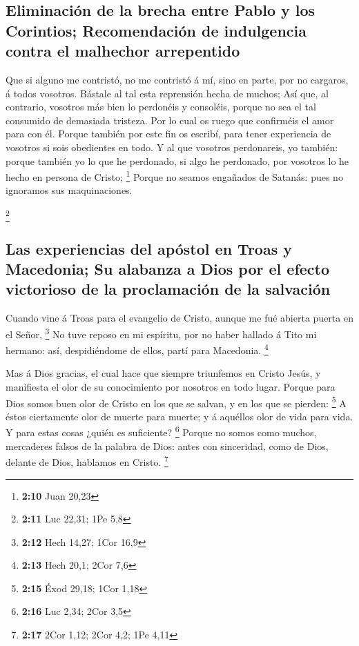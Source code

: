 \hypertarget{eliminaciuxf3n-de-la-brecha-entre-pablo-y-los-corintios-recomendaciuxf3n-de-indulgencia-contra-el-malhechor-arrepentido}{%
\subsection{Eliminación de la brecha entre Pablo y los Corintios;
Recomendación de indulgencia contra el malhechor
arrepentido}\label{eliminaciuxf3n-de-la-brecha-entre-pablo-y-los-corintios-recomendaciuxf3n-de-indulgencia-contra-el-malhechor-arrepentido}}

 Que si alguno me contristó, no me contristó á mí, sino en
parte, por no cargaros, á todos vosotros.  Bástale al tal
esta reprensión hecha de muchos;  Así que, al contrario,
vosotros más bien lo perdonéis y consoléis, porque no sea el tal
consumido de demasiada tristeza.  Por lo cual os ruego que
confirméis el amor para con él.  Porque también por este
fin os escribí, para tener experiencia de vosotros si sois obedientes en
todo.  Y al que vosotros perdonareis, yo también: porque
también yo lo que he perdonado, si algo he perdonado, por vosotros lo he
hecho en persona de Cristo; \footnote{\textbf{2:10} Juan 20,23}
 Porque no seamos engañados de Satanás: pues no ignoramos
sus maquinaciones.

\footnote{\textbf{2:11} Luc 22,31; 1Pe 5,8}

\hypertarget{las-experiencias-del-apuxf3stol-en-troas-y-macedonia-su-alabanza-a-dios-por-el-efecto-victorioso-de-la-proclamaciuxf3n-de-la-salvaciuxf3n}{%
\subsection{Las experiencias del apóstol en Troas y Macedonia; Su
alabanza a Dios por el efecto victorioso de la proclamación de la
salvación}\label{las-experiencias-del-apuxf3stol-en-troas-y-macedonia-su-alabanza-a-dios-por-el-efecto-victorioso-de-la-proclamaciuxf3n-de-la-salvaciuxf3n}}

 Cuando vine á Troas para el evangelio de Cristo, aunque
me fué abierta puerta en el Señor, \footnote{\textbf{2:12} Hech 14,27;
  1Cor 16,9}  No tuve reposo en mi espíritu, por no haber
hallado á Tito mi hermano: así, despidiéndome de ellos, partí para
Macedonia. \footnote{\textbf{2:13} Hech 20,1; 2Cor 7,6}

 Mas á Dios gracias, el cual hace que siempre triunfemos
en Cristo Jesús, y manifiesta el olor de su conocimiento por nosotros en
todo lugar.  Porque para Dios somos buen olor de Cristo
en los que se salvan, y en los que se pierden: \footnote{\textbf{2:15}
  Éxod 29,18; 1Cor 1,18}  A éstos ciertamente olor de
muerte para muerte; y á aquéllos olor de vida para vida. Y para estas
cosas ¿quién es suficiente? \footnote{\textbf{2:16} Luc 2,34; 2Cor 3,5}
 Porque no somos como muchos, mercaderes falsos de la
palabra de Dios: antes con sinceridad, como de Dios, delante de Dios,
hablamos en Cristo. \footnote{\textbf{2:17} 2Cor 1,12; 2Cor 4,2; 1Pe
  4,11}

